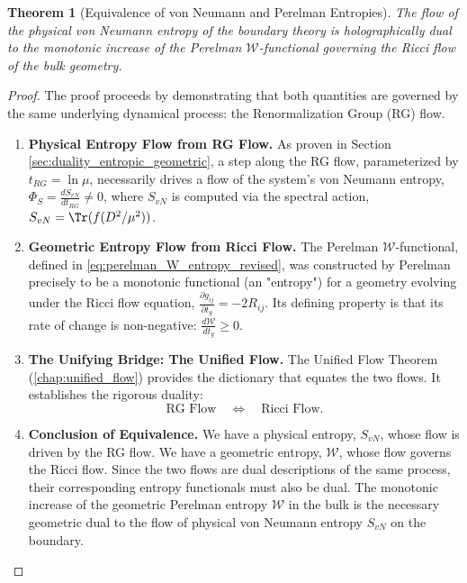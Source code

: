\documentclass[11pt, letterpaper]{report}
\theoremstyle{plain} %
\newtheorem{theorem}{Theorem}[chapter]
\theoremstyle{definition} %
\theoremstyle{remark} %
\begin{document}
\begin{theorem}[Equivalence of von Neumann and Perelman Entropies]
\label{thm:svn_w_equivalence}
The flow of the physical von Neumann entropy of the boundary theory is holographically dual to the monotonic increase of the Perelman $\mathcal{W}$-functional governing the Ricci flow of the bulk geometry.
\end{theorem}
\begin{proof}
The proof proceeds by demonstrating that both quantities are governed by the same underlying dynamical process: the Renormalization Group (RG) flow.
\begin{enumerate}
    \item \textbf{Physical Entropy Flow from RG Flow.} As proven in Section \ref{sec:duality_entropic_geometric}, a step along the RG flow, parameterized by $t_{RG} = \ln\mu$, necessarily drives a flow of the system's von Neumann entropy, $\Phi_S = \frac{dS_{vN}}{dt_{RG}} \neq 0$, where $S_{vN}$ is computed via the spectral action, $S_{vN} = \Tr(f(D^2/\mu^2))$.

    \item \textbf{Geometric Entropy Flow from Ricci Flow.} The Perelman $\mathcal{W}$-functional, defined in \cref{eq:perelman_W_entropy_revised}, was constructed by Perelman precisely to be a monotonic functional (an "entropy") for a geometry evolving under the Ricci flow equation, $\frac{\partial g_{ij}}{\partial t_g} = -2R_{ij}$. Its defining property is that its rate of change is non-negative: $\frac{d\mathcal{W}}{dt_g} \ge 0$.

    \item \textbf{The Unifying Bridge: The Unified Flow.} The Unified Flow Theorem (\cref{chap:unified_flow}) provides the dictionary that equates the two flows. It establishes the rigorous duality:
    \begin{equation}
        \text{RG Flow} \quad \Longleftrightarrow \quad \text{Ricci Flow}.
    \end{equation}

    \item \textbf{Conclusion of Equivalence.} We have a physical entropy, $S_{vN}$, whose flow is driven by the RG flow. We have a geometric entropy, $\mathcal{W}$, whose flow governs the Ricci flow. Since the two flows are dual descriptions of the same process, their corresponding entropy functionals must also be dual. The monotonic increase of the geometric Perelman entropy $\mathcal{W}$ in the bulk is the necessary geometric dual to the flow of physical von Neumann entropy $S_{vN}$ on the boundary.
\end{enumerate}
\end{proof}
\end{document}
